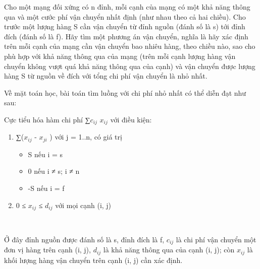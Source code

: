 Cho một mạng đối xứng có n đỉnh, mỗi cạnh của mạng có một khả năng thông qua và một cước phí vận chuyển nhất định (như nhau theo cả hai chiều). Cho trước một lượng hàng S cần vận chuyển từ đỉnh nguồn (đánh số là s) tới đỉnh đích (đánh số là f). Hãy tìm một phương án vận chuyển, nghĩa là hãy xác định trên mỗi cạnh của mạng cần vận chuyển bao nhiêu hàng, theo chiều nào, sao cho phù hợp với khả năng thông qua của mạng (trên mỗi cạnh lượng hàng vận chuyển không vượt quá khả năng thông qua của cạnh) và vận chuyển được lượng hàng S từ nguồn về đích với tổng chi phí vận chuyển là nhỏ nhất.


Về mặt toán học, bài toán tìm luồng với chi phí nhỏ nhất có thể diễn đạt như sau:

Cực tiểu hóa hàm chi phí ∑$c_{ij}$ $x_{ij}$ với điều kiện:
\begin{enumerate}
	\item ∑($x_{ij}$ - $x_{ji}$ ) với j = 1..n, có giá trị
\begin{itemize}
	\item S nếu i = s
	\item 0 nếu i ≠ s; i ≠ n
	\item -S nếu i = f
\end{itemize}
	\item 0 ≤ $x_{ij}$ ≤ $d_{ij}$ với mọi cạnh (i, j)

 
\end{enumerate}

Ở đây đỉnh nguồn được đánh số là s, đỉnh đích là f, $c_{ij}$ là chi phí vận chuyển một đơn vị hàng trên cạnh (i, j), $d_{ij}$ là khả năng thông qua của cạnh (i, j); còn $x_{ij}$ là khối lượng hàng vận chuyển trên cạnh (i, j) cần xác định.